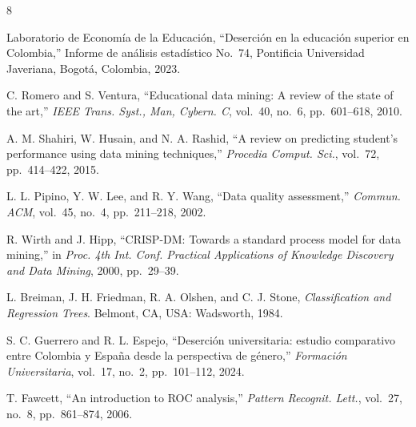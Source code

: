 \documentclass[runningheads]{llncs}
\begin{document}
\begin{thebibliography}{8}
\setlength{\itemsep}{0pt}
\small
 
Laboratorio de Economía de la Educación, ``Deserción en la educación
superior en Colombia,'' Informe de análisis estadístico No.~74,
Pontificia Universidad Javeriana, Bogotá, Colombia, 2023.
 
C. Romero and S. Ventura, ``Educational data mining: A review of the
state of the art,'' \emph{IEEE Trans. Syst., Man, Cybern. C},
vol.~40, no.~6, pp.~601--618, 2010.
 
A. M. Shahiri, W. Husain, and N. A. Rashid, ``A review on predicting
student's performance using data mining techniques,''
\emph{Procedia Comput. Sci.}, vol.~72, pp.~414--422, 2015.
 
L. L. Pipino, Y. W. Lee, and R. Y. Wang, ``Data quality assessment,''
\emph{Commun. ACM}, vol.~45, no.~4, pp.~211--218, 2002.
 
R. Wirth and J. Hipp, ``CRISP-DM: Towards a standard process model for
data mining,'' in \emph{Proc. 4th Int. Conf. Practical Applications of
Knowledge Discovery and Data Mining}, 2000, pp.~29--39.
 
L. Breiman, J. H. Friedman, R. A. Olshen, and C. J. Stone,
\emph{Classification and Regression Trees}. Belmont, CA, USA:
Wadsworth, 1984.
 
S. C. Guerrero and R. L. Espejo, ``Deserción universitaria: estudio
comparativo entre Colombia y España desde la perspectiva de género,''
\emph{Formación Universitaria}, vol.~17, no.~2, pp.~101--112, 2024.
 
T. Fawcett, ``An introduction to ROC analysis,''
\emph{Pattern Recognit. Lett.}, vol.~27, no.~8, pp.~861--874, 2006.
 
\end{thebibliography}
 
\end{document}
